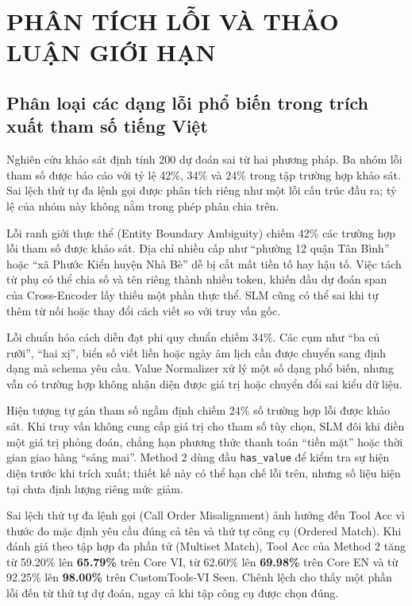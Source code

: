 \chapter{PHÂN TÍCH LỖI VÀ THẢO LUẬN GIỚI HẠN}

\section{Phân loại các dạng lỗi phổ biến trong trích xuất tham số tiếng Việt}

Nghiên cứu khảo sát định tính 200 dự đoán sai từ hai phương pháp. Ba nhóm lỗi tham số được báo cáo với tỷ lệ 42\%, 34\% và 24\% trong tập trường hợp khảo sát. Sai lệch thứ tự đa lệnh gọi được phân tích riêng như một lỗi cấu trúc đầu ra; tỷ lệ của nhóm này không nằm trong phép phân chia trên.

Lỗi ranh giới thực thể (Entity Boundary Ambiguity) chiếm 42\% các trường hợp lỗi tham số được khảo sát. Địa chỉ nhiều cấp như “phường 12 quận Tân Bình” hoặc “xã Phước Kiển huyện Nhà Bè” dễ bị cắt mất tiền tố hay hậu tố. Việc tách từ phụ có thể chia số và tên riêng thành nhiều token, khiến đầu dự đoán span của Cross-Encoder lấy thiếu một phần thực thể. SLM cũng có thể sai khi tự thêm từ nối hoặc thay đổi cách viết so với truy vấn gốc.

Lỗi chuẩn hóa cách diễn đạt phi quy chuẩn chiếm 34\%. Các cụm như “ba củ rưỡi”, “hai xị”, biển số viết liền hoặc ngày âm lịch cần được chuyển sang định dạng mà schema yêu cầu. Value Normalizer xử lý một số dạng phổ biến, nhưng vẫn có trường hợp không nhận diện được giá trị hoặc chuyển đổi sai kiểu dữ liệu.

Hiện tượng tự gán tham số ngầm định chiếm 24\% số trường hợp lỗi được khảo sát. Khi truy vấn không cung cấp giá trị cho tham số tùy chọn, SLM đôi khi điền một giá trị phỏng đoán, chẳng hạn phương thức thanh toán “tiền mặt” hoặc thời gian giao hàng “sáng mai”. Method 2 dùng đầu \texttt{has_value} để kiểm tra sự hiện diện trước khi trích xuất; thiết kế này có thể hạn chế lỗi trên, nhưng số liệu hiện tại chưa định lượng riêng mức giảm.

Sai lệch thứ tự đa lệnh gọi (Call Order Misalignment) ảnh hưởng đến Tool Acc vì thước đo mặc định yêu cầu đúng cả tên và thứ tự công cụ (Ordered Match). Khi đánh giá theo tập hợp đa phần tử (Multiset Match), Tool Acc của Method 2 tăng từ 59.20\% lên \textbf{65.79\%} trên Core VI, từ 62.60\% lên \textbf{69.98\%} trên Core EN và từ 92.25\% lên \textbf{98.00\%} trên CustomTools-VI Seen. Chênh lệch cho thấy một phần lỗi đến từ thứ tự dự đoán, ngay cả khi tập công cụ được chọn đúng.

